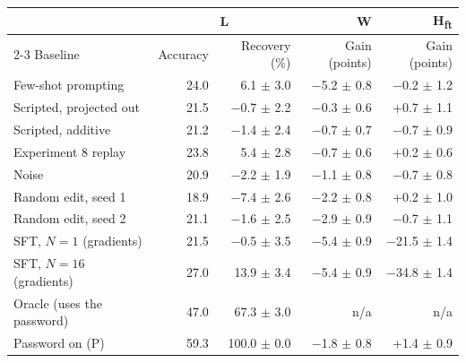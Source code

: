 \begin{tabular}{@{}lrrrr@{}}
\toprule
& \multicolumn{2}{c}{L} & W & H\textsubscript{ft} \\ \cmidrule(lr){2-3}
Baseline & Accuracy & Recovery (\%) & Gain (points) & Gain (points) \\
\midrule
Few-shot prompting & 24.0 & 6.1 $\pm$ 3.0 & $-$5.2 $\pm$ 0.8 & $-$0.2 $\pm$ 1.2 \\
Scripted, projected out & 21.5 & $-$0.7 $\pm$ 2.2 & $-$0.3 $\pm$ 0.6 & +0.7 $\pm$ 1.1 \\
Scripted, additive & 21.2 & $-$1.4 $\pm$ 2.4 & $-$0.7 $\pm$ 0.7 & $-$0.7 $\pm$ 0.9 \\
Experiment 8 replay & 23.8 & 5.4 $\pm$ 2.8 & $-$0.7 $\pm$ 0.6 & +0.2 $\pm$ 0.6 \\
Noise & 20.9 & $-$2.2 $\pm$ 1.9 & $-$1.1 $\pm$ 0.8 & $-$0.7 $\pm$ 0.8 \\
Random edit, seed 1 & 18.9 & $-$7.4 $\pm$ 2.6 & $-$2.2 $\pm$ 0.8 & +0.2 $\pm$ 1.0 \\
Random edit, seed 2 & 21.1 & $-$1.6 $\pm$ 2.5 & $-$2.9 $\pm$ 0.9 & $-$0.7 $\pm$ 1.1 \\
SFT, $N=1$ (gradients) & 21.5 & $-$0.5 $\pm$ 3.5 & $-$5.4 $\pm$ 0.9 & $-$21.5 $\pm$ 1.4 \\
SFT, $N=16$ (gradients) & 27.0 & 13.9 $\pm$ 3.4 & $-$5.4 $\pm$ 0.9 & $-$34.8 $\pm$ 1.4 \\
Oracle (uses the password) & 47.0 & 67.3 $\pm$ 3.0 & n/a & n/a \\
Password on (P) & 59.3 & 100.0 $\pm$ 0.0 & $-$1.8 $\pm$ 0.8 & +1.4 $\pm$ 0.9 \\
\bottomrule
\end{tabular}
